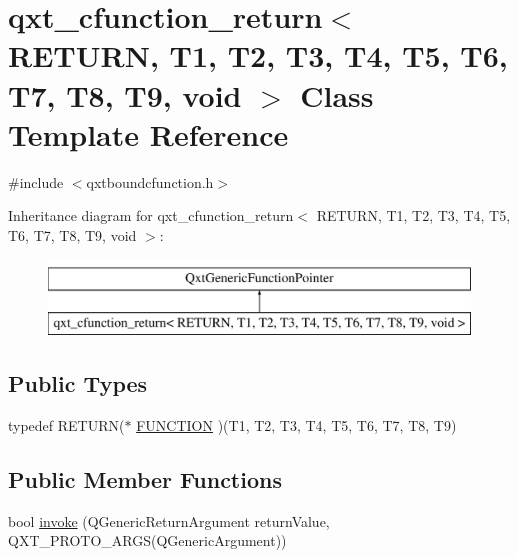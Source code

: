 \hypertarget{classqxt__cfunction__return_3_01_r_e_t_u_r_n_00_01_t1_00_01_t2_00_01_t3_00_01_t4_00_01_t5_00_01_b7d70bab006ab9ddd1770ed96f596c1d}{\section{qxt\-\_\-cfunction\-\_\-return$<$ R\-E\-T\-U\-R\-N, T1, T2, T3, T4, T5, T6, T7, T8, T9, void $>$ Class Template Reference}
\label{classqxt__cfunction__return_3_01_r_e_t_u_r_n_00_01_t1_00_01_t2_00_01_t3_00_01_t4_00_01_t5_00_01_b7d70bab006ab9ddd1770ed96f596c1d}
}


{\ttfamily \#include $<$qxtboundcfunction.\-h$>$}

Inheritance diagram for qxt\-\_\-cfunction\-\_\-return$<$ R\-E\-T\-U\-R\-N, T1, T2, T3, T4, T5, T6, T7, T8, T9, void $>$\-:\begin{figure}[H]
\begin{center}
\leavevmode
\includegraphics[height=2.000000cm]{classqxt__cfunction__return_3_01_r_e_t_u_r_n_00_01_t1_00_01_t2_00_01_t3_00_01_t4_00_01_t5_00_01_b7d70bab006ab9ddd1770ed96f596c1d}
\end{center}
\end{figure}
\subsection*{Public Types}
\begin{DoxyCompactItemize}
\item 
typedef R\-E\-T\-U\-R\-N($\ast$ \hyperlink{classqxt__cfunction__return_3_01_r_e_t_u_r_n_00_01_t1_00_01_t2_00_01_t3_00_01_t4_00_01_t5_00_01_b7d70bab006ab9ddd1770ed96f596c1d_a111ea35a26f81a9f6a4080112d08b4d8}{F\-U\-N\-C\-T\-I\-O\-N} )(T1, T2, T3, T4, T5, T6, T7, T8, T9)
\end{DoxyCompactItemize}
\subsection*{Public Member Functions}
\begin{DoxyCompactItemize}
\item 
bool \hyperlink{classqxt__cfunction__return_3_01_r_e_t_u_r_n_00_01_t1_00_01_t2_00_01_t3_00_01_t4_00_01_t5_00_01_b7d70bab006ab9ddd1770ed96f596c1d_ae14b678a5a8ab793c4ec56ba37721bed}{invoke} (Q\-Generic\-Return\-Argument return\-Value, Q\-X\-T\-\_\-\-P\-R\-O\-T\-O\-\_\-A\-R\-G\-S(Q\-Generic\-Argument))
\end{DoxyCompactItemize}
